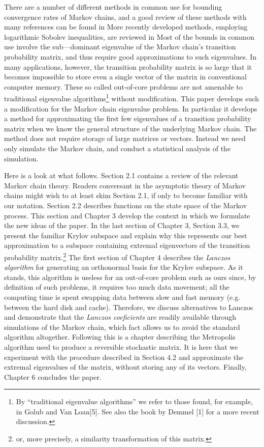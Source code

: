 There are a number of different methods in common use for bounding convergence rates of
Markov chains, and a good review of these methods with many references can be found in  More
recently developed methods, employing logarithmic Sobolev inequalities, are reviewed in  Most
of the bounds in common use involve the sub—dominant eigenvalue of the Markov chain's transition
probability matrix, and thus require good approximations to such eigenvalues. In many applications,
however, the transition probability matrix is so large that it becomes impossible to store even a
single vector of the matrix in conventional computer memory. These so called out-of-core problems
are not amenable to traditional eigenvalue algorithms\footnote{By ``traditional
  eigenvalue algorithms'' we refer to those found, for example, in Golub and Van
  Loan[5]. See also the book by Demmel [1] for a more recent discussion.}
without modification. This paper develops 
such a modification for the Markov chain eigenvalue problem. In particular it develops a method
for approximating the first few eigenvalues of a transition probability matrix when we know the
general structure of the underlying Markov chain. The method does not require storage of large
matrices or vectors. Instead we need only simulate the Markov chain, and conduct a statistical
analysis of the simulation.

Here is a look at what follows. Section 2.1 contains a review of the relevant Markov chain
theory. Readers conversant in the asymptotic theory of Markov chains might wish to at least skim
Section 2.1, if only to become familiar with our notation. Section 2.2 describes functions on the state
space of the Markov process. This section and Chapter 3 develop the context in which we formulate
the new ideas of the paper. In the last section of Chapter 3, Section 3.3, we present the familiar
Krylov subspace and explain why this represents our best approximation to a subspace containing
extremal eigenvectors of the transition probability matrix.\footnote{or, more
  precisely, a similarity transformation of this matrix.} The first section of
Chapter 4 describes the \emph{Lanczos algorithm} for generating an orthonormal basis
for the Krylov subspace. As it stands, this algorithm is useless for an
out-of-core problem such as ours since, by definition of such problems, 
it requires too much data movement; all the computing time is spent swapping data between slow
and fast memory (e.g. between the hard disk and cache). Therefore, we discuss alternatives to
Lanczos and demonstrate that the \emph{Lanczos coeficients} are readily available through simulations of
the Markov chain, which fact allows us to avoid the standard algorithm altogether. Following this
is a chapter describing the Metropolis algorithm used to produce a reversible stochastic matrix.
It is here that we experiment with the procedure described in Section 4.2 and approximate the
extremal eigenvalues of the matrix, without storing any of its vectors. Finally, Chapter 6 concludes
the paper.
